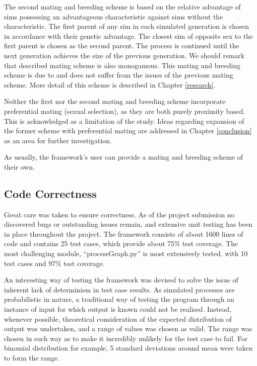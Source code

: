 \documentclass{l4proj}
\begin{document}
The second mating and breeding scheme is based on the relative advantage of sims possessing an advantageous characteristic against sims without the characteristic. The first parent of any sim in each simulated generation is chosen in accordance with their genetic advantage. The closest sim of opposite sex to the first parent is chosen as the second parent. The process is continued until the next generation achieves the size of the previous generation. We should remark that described mating scheme is also monogamous. This mating and breeding scheme is due to \textcite{peng10} and does not suffer from the issues of the previous mating scheme. More detail of this scheme is described in Chapter \ref{research}.

Neither the first nor the second mating and breeding scheme incorporate preferential mating (sexual selection), as they are both purely proximity based. This is acknowledged as a limitation of the study. Ideas regarding expansion of the former scheme with preferential mating are addressed in Chapter \ref{conclusion} as an area for further investigation.

As usually, the framework's user can provide a mating and breeding scheme of their own.

\subsection{Code Correctness}
Great care was taken to ensure correctness. As of the project submission no discovered bugs or outstanding issues remain, and extensive unit testing has been in place throughout the project. The framework consists of about 1600 lines of code and contains 25 test cases, which provide about 75\% test coverage. The most challenging module, ``processGraph.py'' is most extensively tested, with 10 test cases and 97\% test coverage.

An interesting way of testing the framework was devised to solve the issue of inherent lack of determinism in test case results. As simulated processes are probabilistic in nature, a traditional way of testing the program through an instance of input for which output is known could not be realised. Instead, whenever possible, theoretical consideration of the expected distribution of output was undertaken, and a range of values was chosen as valid. The range was chosen in such way as to make it incredibly unlikely for the test case to fail. For binomial distribution for example, 5 standard deviations around mean were taken to form the range.
\end{document}
